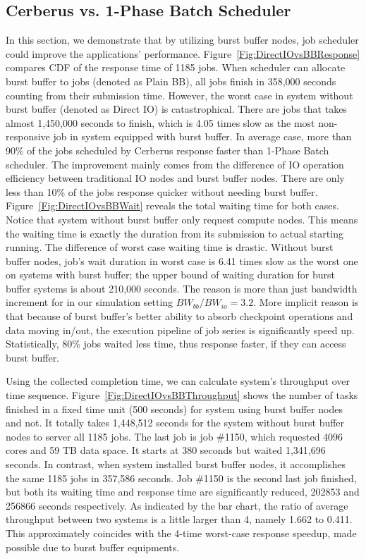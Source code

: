 \subsection{Cerberus vs. 1-Phase Batch Scheduler}
\label{Sec:Sim:DirectIOvsBB}
In this section, we demonstrate that by utilizing burst buffer nodes,
job scheduler could improve the applications' performance.
Figure~\ref{Fig:DirectIOvsBBResponse} compares CDF of the response time of 1185 jobs.
When scheduler can allocate burst buffer to jobs (denoted as Plain BB),
all jobs finish in 358,000 seconds counting from their submission time.
However, the worst case in system without burst buffer (denoted as Direct IO) is catastrophical.
There are jobs that takes almost 1,450,000 seconds to finish,
which is 4.05 times slow as the most non-responsive job
in system equipped with burst buffer.
In average case, more than 90\% of the jobs scheduled by Cerberus
response faster than 1-Phase Batch scheduler.
The improvement mainly comes from the difference of IO operation efficiency between
traditional IO nodes and burst buffer nodes.
There are only less than 10\% of the jobs response quicker without needing burst buffer.
Figure~\ref{Fig:DirectIOvsBBWait} reveals the total waiting time for both cases.
Notice that system without burst buffer only request compute nodes.
This means the waiting time is exactly the duration
from its submission to actual starting running.
The difference of worst case waiting time is drastic.
Without burst buffer nodes, job's wait duration in worst case is 6.41 times
slow as the worst one on systems with burst buffer;
the upper bound of waiting duration for burst buffer systems is about 210,000 seconds.
The reason is more than just bandwidth increment
for in our simulation setting $BW_{bb} / BW_{io}=3.2$.
More implicit reason is that because of burst buffer's better ability to
absorb checkpoint operations and data moving in/out,
the execution pipeline of job series is significantly speed up.
Statistically, 80\% jobs waited less time, thus response faster,
if they can access burst buffer.


Using the collected completion time, we can calculate system's throughput over time sequence.
Figure~\ref{Fig:DirectIOvsBBThroughput} shows the number of tasks finished
in a fixed time unit (500 seconds) for system using burst buffer nodes and not.
It totally takes 1,448,512 seconds for the system without burst buffer nodes to
server all 1185 jobs.
The last job is job \#1150, which requested 4096 cores and 59 TB data space.
It starts at 380 seconds but waited 1,341,696 seconds.
In contrast, when system installed burst buffer nodes,
it accomplishes the same 1185 jobs in 357,586 seconds.
Job \#1150 is the second last job finished, but both its waiting time and response time
are significantly reduced, 202853 and 256866 seconds respectively.
As indicated by the bar chart,
the ratio of average throughput between two systems is a little larger than 4, namely 1.662 to 0.411.
This approximately coincides with the 4-time worst-case response speedup,
made possible due to burst buffer equipments.

